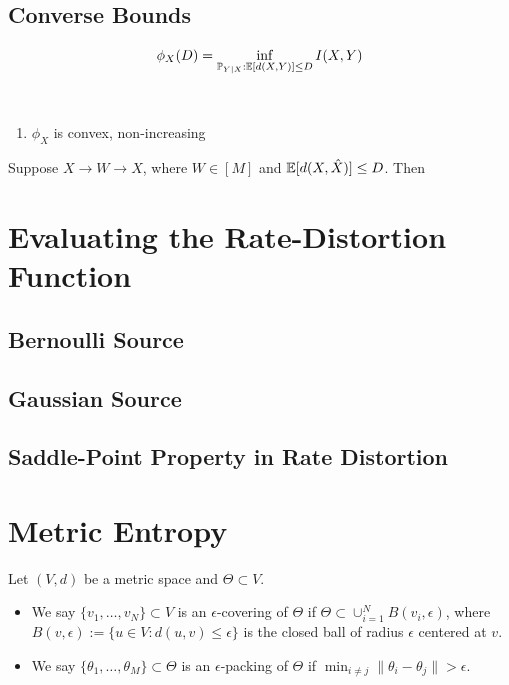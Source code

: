 \subsection{Converse Bounds}
\begin{definition}
    \begin{equation}\label{eq:rate-distortion function}
        \phi_X(D)=\inf_{\mathbb{P}_{Y|X}:\mathbb{E}[d(X,Y)]\leq D }I(X,Y)
    \end{equation}
\end{definition}
\begin{proposition}
    \
    \begin{enumerate}[label=(\roman*)]
        \item $\phi_X$ is convex, non-increasing
    \end{enumerate}
\end{proposition}
\begin{theorem}
    Suppose $X\to W\to \hat{X}$, where $W\in [M]$ and $\mathbb{E}[d(X,\hat{X})]\leq D$. Then 

\end{theorem}

\section{Evaluating the Rate-Distortion Function}

\subsection{Bernoulli Source}


\subsection{Gaussian Source}


\subsection{Saddle-Point Property in Rate Distortion}


\section{Metric Entropy}
\begin{definition}
    Let $(V,d)$ be a metric space and $\Theta\subset V$.
    \begin{itemize}
        \item We say $\{v_1,\dots,v_N\}\subset V$ is an $\epsilon$-covering of $\Theta$ if $\Theta\subset \cup_{i=1}^N B(v_i,\epsilon)$, where $B(v,\epsilon):=\{u\in V:d(u,v)\leq\epsilon\}$ is the closed ball of radius $\epsilon$ centered at $v$.
        \item We say $\{\theta_1,\dots,\theta_M\}\subset\Theta$ is an $\epsilon$-packing of $\Theta$ if $\min_{i\neq j}\|\theta_i-\theta_j\|>\epsilon$.
    \end{itemize}
\end{definition}


